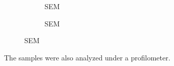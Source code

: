 \begin{figure}[ht]
\begin{subfigure}[t]{0.24\linewidth}
	\caption{SEM}
	\label{fig:b2d28_q28}
\end{subfigure}
  \begin{subfigure}[t]{0.24\linewidth}
	\centering
	\caption{SEM}
	\label{fig:b2d29_q29}
\end{subfigure}
\end{figure}


The samples were also analyzed under a profilometer.

